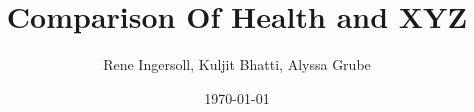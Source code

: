 \documentclass{beamer} %
\title[Comparison of Health XYZ]{Comparison Of Health and XYZ}
\institute[UNL]{University of Nebraska-Lincoln}
\author{Rene Ingersoll, Kuljit Bhatti, Alyssa Grube}
\date{\today}
\begin{document}
 

\begin{frame}

                \titlepage

\end{frame}

 


 

 

\begin{frame}

 

\end{frame}

 

 

 

 

\printbibliography

 
\end{document}
